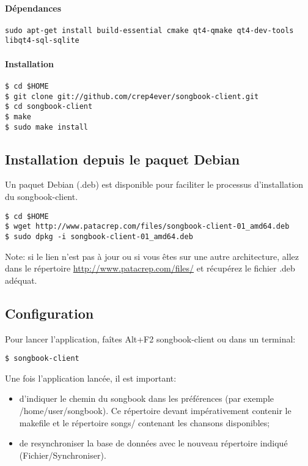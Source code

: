 \documentclass[a4paper]{article}
\begin{document}
\paragraph{Dépendances}
\begin{verbatim}
sudo apt-get install build-essential cmake qt4-qmake qt4-dev-tools libqt4-sql-sqlite
\end{verbatim}

\paragraph{Installation}
\begin{verbatim}
$ cd $HOME
$ git clone git://github.com/crep4ever/songbook-client.git
$ cd songbook-client
$ make
$ sudo make install
\end{verbatim}

\subsection{Installation depuis le paquet Debian}

Un paquet Debian (.deb) est disponible pour faciliter le processus
d'installation du songbook-client. 

\begin{verbatim}
$ cd $HOME
$ wget http://www.patacrep.com/files/songbook-client-01_amd64.deb
$ sudo dpkg -i songbook-client-01_amd64.deb
\end{verbatim}

Note: si le lien n'est pas à jour ou si vous êtes sur une autre
architecture, allez dans le répertoire
\url{http://www.patacrep.com/files/} et récupérez le fichier
.deb adéquat.

\subsection{Configuration}

Pour lancer l'application, faîtes Alt+F2 songbook-client ou dans un
terminal:
\begin{verbatim}
$ songbook-client
\end{verbatim}

Une fois l'application lancée, il est important:
\begin{itemize}
\item d'indiquer le chemin du songbook dans les préférences (par
  exemple /home/user/songbook). Ce répertoire devant impérativement
  contenir le makefile et le répertoire songs/ contenant les chansons
  disponibles;
\item de resynchroniser la base de données avec le nouveau répertoire
  indiqué (Fichier/Synchroniser).
\end{itemize}
\end{document}
